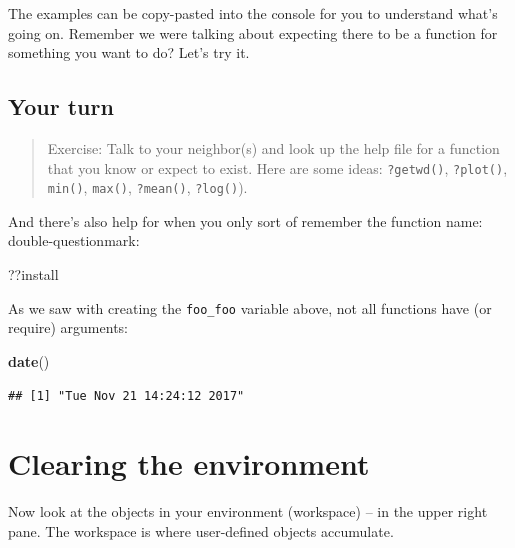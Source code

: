 \documentclass[]{book}
\newenvironment{Shaded}{\begin{snugshade}}{\end{snugshade}}
\newcommand{\KeywordTok}[1]{\textcolor[rgb]{0.13,0.29,0.53}{\textbf{{#1}}}}
\newcommand{\NormalTok}[1]{{#1}}
\theoremstyle{definition}
\theoremstyle{definition}
\theoremstyle{definition}
\theoremstyle{remark}
\begin{document}
The examples can be copy-pasted into the console for you to understand
what's going on. Remember we were talking about expecting there to be a
function for something you want to do? Let's try it.

\subsection{Your turn}\label{your-turn}

\begin{quote}
Exercise: Talk to your neighbor(s) and look up the help file for a
function that you know or expect to exist. Here are some ideas:
\texttt{?getwd()}, \texttt{?plot()}, \texttt{min()}, \texttt{max()},
\texttt{?mean()}, \texttt{?log()}).
\end{quote}

And there's also help for when you only sort of remember the function
name: double-questionmark:

\begin{Shaded}
\begin{Highlighting}[]
\NormalTok{??install }
\end{Highlighting}
\end{Shaded}

As we saw with creating the \texttt{foo\_foo} variable above, not all
functions have (or require) arguments:

\begin{Shaded}
\begin{Highlighting}[]
\KeywordTok{date}\NormalTok{()}
\end{Highlighting}
\end{Shaded}

\begin{verbatim}
## [1] "Tue Nov 21 14:24:12 2017"
\end{verbatim}

\section{Clearing the environment}\label{clearing-the-environment}

Now look at the objects in your environment (workspace) -- in the upper
right pane. The workspace is where user-defined objects accumulate.
\end{document}
